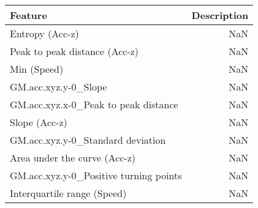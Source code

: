 \begin{table}
\centering
\label{table:reg_fs}
\begin{tabular}{lr}
\toprule
                      \textbf{Feature} & \textbf{Description} \\
\midrule
                       Entropy (Acc-z) &                  NaN \\
         Peak to peak distance (Acc-z) &                  NaN \\
                           Min (Speed) &                  NaN \\
                  GM.acc.xyz.y-0_Slope &                  NaN \\
  GM.acc.xyz.x-0_Peak to peak distance &                  NaN \\
                         Slope (Acc-z) &                  NaN \\
     GM.acc.xyz.y-0_Standard deviation &                  NaN \\
          Area under the curve (Acc-z) &                  NaN \\
GM.acc.xyz.y-0_Positive turning points &                  NaN \\
           Interquartile range (Speed) &                  NaN \\
\bottomrule
\end{tabular}
\end{table}

